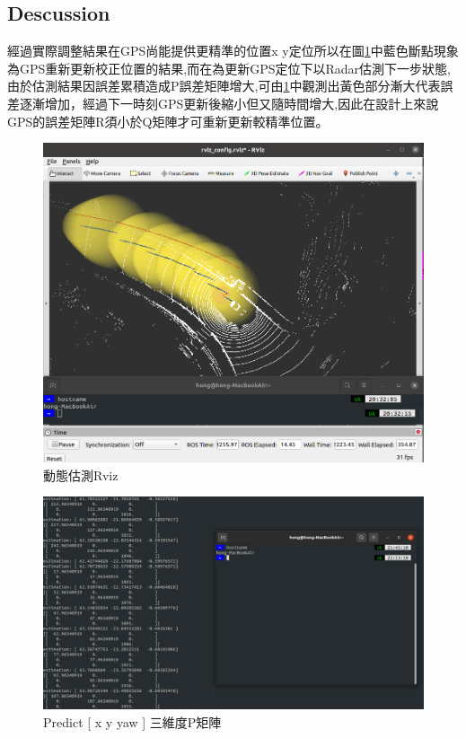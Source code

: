 \documentclass{article}
\begin{document}
\subsection{Descussion}
經過實際調整結果在GPS尚能提供更精準的位置x y定位所以在圖\ref{fig:1}中藍色斷點現象為GPS重新更新校正位置的結果,而在為更新GPS定位下以Radar估測下一步狀態,由於估測結果因誤差累積造成P誤差矩陣增大,可由\ref{fig:1}中觀測出黃色部分漸大代表誤差逐漸增加，經過下一時刻GPS更新後縮小但又隨時間增大,因此在設計上來說GPS的誤差矩陣R須小於Q矩陣才可重新更新較精準位置。
\begin{figure}[H]
\begin{center}
	\includegraphics[scale=0.35]{predict_3.png}
	\caption{動態估測Rviz}
	\label{fig:1}
\end{center}
\end{figure}
\begin{figure}[H]
	\centering
	\includegraphics[scale=0.3]{./predict3.png}
	\caption{Predict [ x y yaw ] 三維度P矩陣}
\end{figure}
\end{document}
